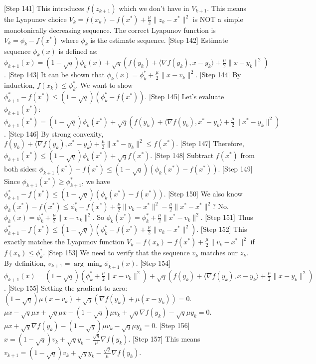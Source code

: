 \documentclass{article}
\begin{document}
[Step 141] This introduces $f(z_{k+1})$ which we don't have in $V_{k+1}$. This means the Lyapunov choice $V_k = f(x_k) - f(x^*) + \frac{\mu}{2}\|z_k - x^*\|^2$ is NOT a simple monotonically decreasing sequence.
The correct Lyapunov function is $V_k = \phi_k - f(x^*)$ where $\phi_k$ is the estimate sequence.
[Step 142] Estimate sequence $\phi_k(x)$ is defined as:
$\phi_{k+1}(x) = (1-\sqrt{q})\phi_k(x) + \sqrt{q}(f(y_k) + \langle \nabla f(y_k), x - y_k \rangle + \frac{\mu}{2}\|x - y_k\|^2)$.
[Step 143] It can be shown that $\phi_k(x) = \phi_k^* + \frac{\mu}{2}\|x - v_k\|^2$.
[Step 144] By induction, $f(x_k) \le \phi_k^*$. We want to show $\phi_{k+1}^* - f(x^*) \le (1-\sqrt{q})(\phi_k^* - f(x^*))$.
[Step 145] Let's evaluate $\phi_{k+1}(x^*)$:
$\phi_{k+1}(x^*) = (1-\sqrt{q})\phi_k(x^*) + \sqrt{q}(f(y_k) + \langle \nabla f(y_k), x^* - y_k \rangle + \frac{\mu}{2}\|x^* - y_k\|^2)$.
[Step 146] By strong convexity, $f(y_k) + \langle \nabla f(y_k), x^* - y_k \rangle + \frac{\mu}{2}\|x^* - y_k\|^2 \le f(x^*)$.
[Step 147] Therefore, $\phi_{k+1}(x^*) \le (1-\sqrt{q})\phi_k(x^*) + \sqrt{q}f(x^*)$.
[Step 148] Subtract $f(x^*)$ from both sides:
$\phi_{k+1}(x^*) - f(x^*) \le (1-\sqrt{q})(\phi_k(x^*) - f(x^*))$.
[Step 149] Since $\phi_{k+1}(x^*) \ge \phi_{k+1}^*$, we have $\phi_{k+1}^* - f(x^*) \le (1-\sqrt{q})(\phi_k(x^*) - f(x^*))$.
[Step 150] We also know $\phi_k(x^*) - f(x^*) \le \phi_k^* - f(x^*) + \frac{\mu}{2}\|v_k - x^*\|^2 - \frac{\mu}{2}\|x^* - x^*\|^2$? No.
$\phi_k(x) = \phi_k^* + \frac{\mu}{2}\|x - v_k\|^2$.
So $\phi_k(x^*) = \phi_k^* + \frac{\mu}{2}\|x^* - v_k\|^2$.
[Step 151] Thus $\phi_{k+1}^* - f(x^*) \le (1-\sqrt{q})(\phi_k^* - f(x^*) + \frac{\mu}{2}\|v_k - x^*\|^2)$.
[Step 152] This exactly matches the Lyapunov function $V_k = f(x_k) - f(x^*) + \frac{\mu}{2}\|v_k - x^*\|^2$ if $f(x_k) \le \phi_k^*$.
[Step 153] We need to verify that the sequence $v_k$ matches our $z_k$.
By definition, $v_{k+1} = \arg\min_x \phi_{k+1}(x)$.
[Step 154] $\phi_{k+1}(x) = (1-\sqrt{q})(\phi_k^* + \frac{\mu}{2}\|x - v_k\|^2) + \sqrt{q}(f(y_k) + \langle \nabla f(y_k), x - y_k \rangle + \frac{\mu}{2}\|x - y_k\|^2)$.
[Step 155] Setting the gradient to zero:
$(1-\sqrt{q})\mu(x - v_k) + \sqrt{q}(\nabla f(y_k) + \mu(x - y_k)) = 0$.
$\mu x - \sqrt{q}\mu x + \sqrt{q}\mu x - (1-\sqrt{q})\mu v_k + \sqrt{q}\nabla f(y_k) - \sqrt{q}\mu y_k = 0$.
$\mu x + \sqrt{q}\nabla f(y_k) - (1-\sqrt{q})\mu v_k - \sqrt{q}\mu y_k = 0$.
[Step 156] $x = (1-\sqrt{q})v_k + \sqrt{q}y_k - \frac{\sqrt{q}}{\mu}\nabla f(y_k)$.
[Step 157] This means $v_{k+1} = (1-\sqrt{q})v_k + \sqrt{q}y_k - \frac{\sqrt{q}}{\mu}\nabla f(y_k)$.
\end{document}
